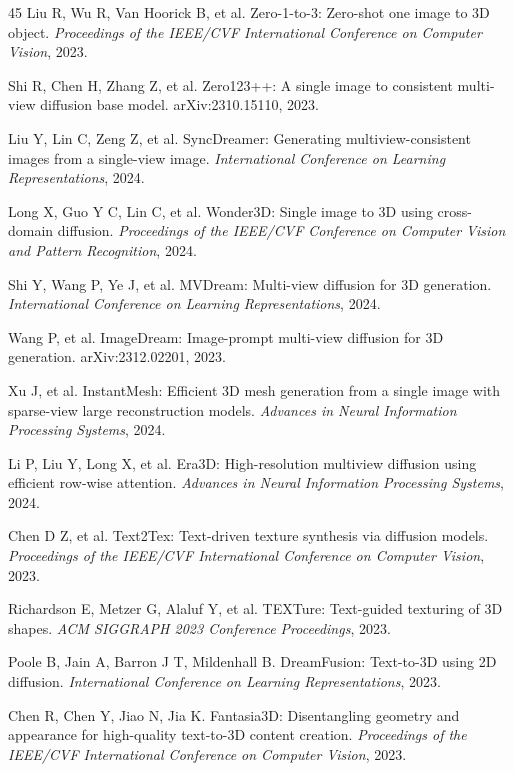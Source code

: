 \documentclass[times,twocolumn,final]{elsarticle}
\begin{document}
\begin{thebibliography}{45}
Liu R, Wu R, Van Hoorick B, et al. Zero-1-to-3: Zero-shot one image to 3D object. \textit{Proceedings of the IEEE/CVF International Conference on Computer Vision}, 2023.

Shi R, Chen H, Zhang Z, et al. Zero123++: A single image to consistent multi-view diffusion base model. arXiv:2310.15110, 2023.

Liu Y, Lin C, Zeng Z, et al. SyncDreamer: Generating multiview-consistent images from a single-view image. \textit{International Conference on Learning Representations}, 2024.

Long X, Guo Y C, Lin C, et al. Wonder3D: Single image to 3D using cross-domain diffusion. \textit{Proceedings of the IEEE/CVF Conference on Computer Vision and Pattern Recognition}, 2024.

Shi Y, Wang P, Ye J, et al. MVDream: Multi-view diffusion for 3D generation. \textit{International Conference on Learning Representations}, 2024.

Wang P, et al. ImageDream: Image-prompt multi-view diffusion for 3D generation. arXiv:2312.02201, 2023.

Xu J, et al. InstantMesh: Efficient 3D mesh generation from a single image with sparse-view large reconstruction models. \textit{Advances in Neural Information Processing Systems}, 2024.

Li P, Liu Y, Long X, et al. Era3D: High-resolution multiview diffusion using efficient row-wise attention. \textit{Advances in Neural Information Processing Systems}, 2024.

Chen D Z, et al. Text2Tex: Text-driven texture synthesis via diffusion models. \textit{Proceedings of the IEEE/CVF International Conference on Computer Vision}, 2023.

Richardson E, Metzer G, Alaluf Y, et al. TEXTure: Text-guided texturing of 3D shapes. \textit{ACM SIGGRAPH 2023 Conference Proceedings}, 2023.

Poole B, Jain A, Barron J T, Mildenhall B. DreamFusion: Text-to-3D using 2D diffusion. \textit{International Conference on Learning Representations}, 2023.

Chen R, Chen Y, Jiao N, Jia K. Fantasia3D: Disentangling geometry and appearance for high-quality text-to-3D content creation. \textit{Proceedings of the IEEE/CVF International Conference on Computer Vision}, 2023.


\end{thebibliography}
\end{document}

